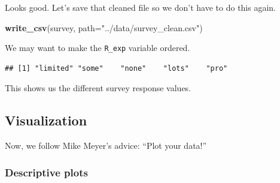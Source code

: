 \documentclass[]{article}
\newenvironment{Shaded}{\begin{snugshade}}{\end{snugshade}}
\newcommand{\KeywordTok}[1]{\textcolor[rgb]{0.13,0.29,0.53}{\textbf{#1}}}
\newcommand{\DataTypeTok}[1]{\textcolor[rgb]{0.13,0.29,0.53}{#1}}
\newcommand{\StringTok}[1]{\textcolor[rgb]{0.31,0.60,0.02}{#1}}
\newcommand{\OperatorTok}[1]{\textcolor[rgb]{0.81,0.36,0.00}{\textbf{#1}}}
\newcommand{\NormalTok}[1]{#1}
\begin{document}
Looks good. Let's save that cleaned file so we don't have to do this
again.

\begin{Shaded}
\begin{Highlighting}[]
\KeywordTok{write_csv}\NormalTok{(survey, }\DataTypeTok{path=}\StringTok{"../data/survey_clean.csv"}\NormalTok{)}
\end{Highlighting}
\end{Shaded}

We may want to make the \texttt{R\_exp} variable ordered.

\begin{Shaded}
\end{Shaded}

\begin{verbatim}
## [1] "limited" "some"    "none"    "lots"    "pro"
\end{verbatim}

This shows us the different survey response values.

\begin{Shaded}
\end{Shaded}

\subsection{Visualization}\label{visualization}

Now, we follow Mike Meyer's advice: ``Plot your data!''

\subsubsection{Descriptive plots}\label{descriptive-plots}
\end{document}
